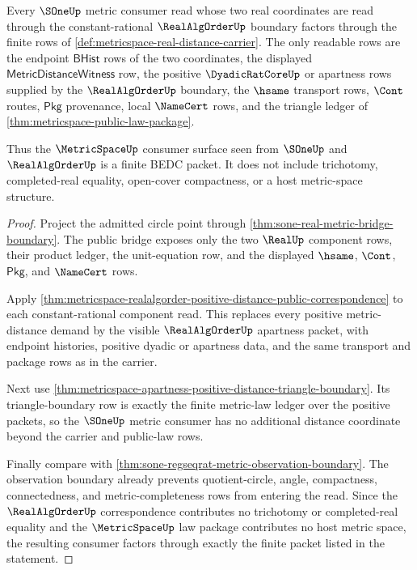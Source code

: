 \begin{theorem}
\label{thm:metricspace-s1-realalgorder-consumer-factorization}
Every $\SOneUp$ metric consumer read whose two real coordinates are read
through the constant-rational $\RealAlgOrderUp$ boundary factors through the
finite rows of \autoref{def:metricspace-real-distance-carrier}. The only
readable rows are the endpoint $\mathsf{BHist}$ rows of the two coordinates,
the displayed $\mathsf{MetricDistanceWitness}$ row, the positive
$\DyadicRatCoreUp$ or apartness rows supplied by the $\RealAlgOrderUp$
boundary, the $\hsame$ transport rows, $\Cont$ routes, $\mathsf{Pkg}$
provenance, local $\NameCert$ rows, and the triangle ledger of
\autoref{thm:metricspace-public-law-package}.

Thus the $\MetricSpaceUp$ consumer surface seen from $\SOneUp$ and
$\RealAlgOrderUp$ is a finite BEDC packet. It does not include trichotomy,
completed-real equality, open-cover compactness, or a host metric-space
structure.
\end{theorem}
\begin{proof}
Project the admitted circle point through
\autoref{thm:sone-real-metric-bridge-boundary}. The public bridge exposes only
the two $\RealUp$ component rows, their product ledger, the unit-equation row,
and the displayed $\hsame$, $\Cont$, $\mathsf{Pkg}$, and $\NameCert$ rows.

Apply
\autoref{thm:metricspace-realalgorder-positive-distance-public-correspondence}
to each constant-rational component read. This replaces every positive
metric-distance demand by the visible $\RealAlgOrderUp$ apartness packet, with
endpoint histories, positive dyadic or apartness data, and the same transport
and package rows as in the carrier.

Next use
\autoref{thm:metricspace-apartness-positive-distance-triangle-boundary}. Its
triangle-boundary row is exactly the finite metric-law ledger over the
positive packets, so the $\SOneUp$ metric consumer has no additional distance
coordinate beyond the carrier and public-law rows.

Finally compare with
\autoref{thm:sone-regseqrat-metric-observation-boundary}. The observation
boundary already prevents quotient-circle, angle, compactness, connectedness,
and metric-completeness rows from entering the read. Since the
$\RealAlgOrderUp$ correspondence contributes no trichotomy or completed-real
equality and the $\MetricSpaceUp$ law package contributes no host metric
space, the resulting consumer factors through exactly the finite packet listed
in the statement.
\end{proof}

